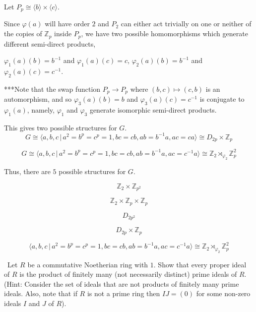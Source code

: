 \documentclass[12pt]{AlgebraQual}
\begin{document}
\begin{solution}
Let $P_p\cong\langle b\rangle\times\langle c\rangle.$

Since $\varphi(a)$ will have order $2$ and $P_2$ can either act trivially on one or neither of the copies of $\mathbb{Z}_p$ inside $P_p$, we have two possible homomorphisms which generate different semi-direct products,

$\varphi_1(a)(b)=b^{-1}$ and $\varphi_1(a)(c)=c$, $\varphi_2(a)(b)=b^{-1}$ and $\varphi_2(a)(c)=c^{-1}$.

\begin{mybox}
***Note that the swap function $P_p\to P_p$ where $(b,c)\mapsto (c,b)$ is an automorphism, and so $\varphi_3(a)(b)=b$ and $\varphi_3(a)(c)=c^{-1}$ is conjugate to $\varphi_1(a)$, namely, $\varphi_1$ and $\varphi_3$ generate isomorphic semi-direct products.
\end{mybox}

This gives two possible structures for $G$. $$G\cong\langle a,b,c\,|\,a^2=b^p=c^p=1,bc=cb,ab=b^{-1}a,ac=ca\rangle\cong D_{2p}\times\mathbb{Z}_p$$

$$G\cong\langle a,b,c\,|\,a^2=b^p=c^p=1,bc=cb,ab=b^{-1}a,ac=c^{-1}a\rangle\cong \mathbb{Z}_2\rtimes_{\varphi_2}\mathbb{Z}_p^2$$

Thus, there are $5$ possible structures for $G.$

\begin{center}
    \begin{framed}
    $$\mathbb{Z}_2\times\mathbb{Z}_{p^2}$$

    $$\mathbb{Z}_2\times\mathbb{Z}_p\times\mathbb{Z}_p$$

    $$D_{2p^2}$$

    $$D_{2p}\times\mathbb{Z}_p$$

    $$\langle a,b,c\,|\,a^2=b^p=c^p=1,bc=cb,ab=b^{-1}a,ac=c^{-1}a\rangle\cong \mathbb{Z}_2\rtimes_{\varphi_2}\mathbb{Z}_p^2$$
    \end{framed}
\end{center}
\end{solution}
\newpage


\begin{problem} $\,$
Let $R$ be a commutative Noetherian ring with $1$. Show that every proper ideal of $R$ is the product of finitely many (not necessarily distinct) prime ideals of $R$. (Hint: Consider the set of ideals that are not products of finitely many prime ideals. Also, note that if $R$ is not a prime ring then $IJ=(0)$ for some non-zero ideals $I$ and $J$ of $R$).
\end{problem}
\end{document}
